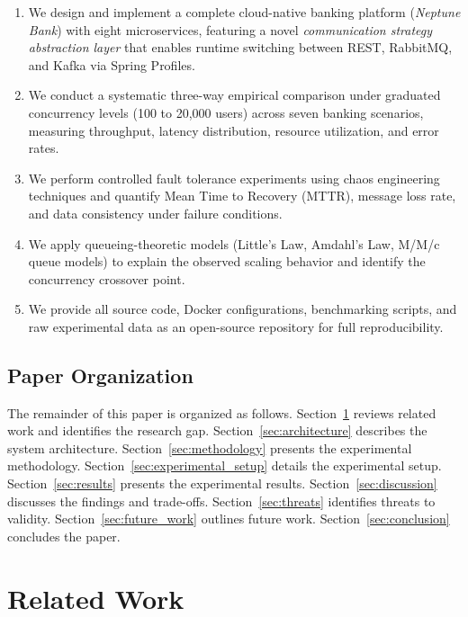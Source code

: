 \documentclass[journal]{IEEEtran}
\begin{document}
\begin{enumerate}
    \item We design and implement a complete cloud-native banking platform (\textit{Neptune Bank}) with eight microservices, featuring a novel \textit{communication strategy abstraction layer} that enables runtime switching between REST, RabbitMQ, and Kafka via Spring Profiles.
    \item We conduct a systematic three-way empirical comparison under graduated concurrency levels (100 to 20,000 users) across seven banking scenarios, measuring throughput, latency distribution, resource utilization, and error rates.
    \item We perform controlled fault tolerance experiments using chaos engineering techniques and quantify Mean Time to Recovery (MTTR), message loss rate, and data consistency under failure conditions.
    \item We apply queueing-theoretic models (Little's Law, Amdahl's Law, M/M/c queue models) to explain the observed scaling behavior and identify the concurrency crossover point.
    \item We provide all source code, Docker configurations, benchmarking scripts, and raw experimental data as an open-source repository for full reproducibility.
\end{enumerate}

\subsection{Paper Organization}
\label{subsec:organization}

The remainder of this paper is organized as follows. Section~\ref{sec:related_work} reviews related work and identifies the research gap. Section~\ref{sec:architecture} describes the system architecture. Section~\ref{sec:methodology} presents the experimental methodology. Section~\ref{sec:experimental_setup} details the experimental setup. Section~\ref{sec:results} presents the experimental results. Section~\ref{sec:discussion} discusses the findings and trade-offs. Section~\ref{sec:threats} identifies threats to validity. Section~\ref{sec:future_work} outlines future work. Section~\ref{sec:conclusion} concludes the paper.


\section{Related Work}
\label{sec:related_work}
\end{document}
